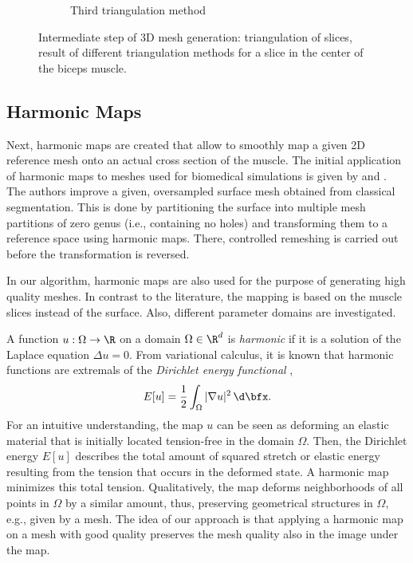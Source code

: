 \begin{figure}
\begin{subfigure}[t]{0.32\textwidth}
    \caption{Third triangulation method}%
    \label{fig:triangulation_2}%
  \end{subfigure}
  \caption{Intermediate step of 3D mesh generation: triangulation of slices, result of different triangulation methods for a slice in the center of the biceps muscle.}%
  \label{fig:triangulations}%
\end{figure}%

\subsection{Harmonic Maps}

Next, harmonic maps are created that allow to smoothly map a given 2D reference mesh onto an actual cross section of the muscle. The initial application of harmonic maps to meshes used for biomedical simulations is given by \cite{marchandise2010quality} and \cite{Marchandise2_2011}. The authors improve a given, oversampled surface mesh obtained from classical segmentation. This is done by partitioning the surface into multiple mesh partitions of zero genus (i.e., containing no holes) and transforming them to a reference space using harmonic maps. There, controlled remeshing is carried out before the transformation is reversed.

In our algorithm, harmonic maps are also used for the purpose of generating high quality meshes. In contrast to the literature, the mapping is based on the muscle slices instead of the surface. Also, different parameter domains are investigated.

A function $u: \Omega \to \R$ on a domain $\Omega \in \R^d$ is \emph{harmonic} if it is a solution of the Laplace equation $Δu = 0$.
From variational calculus, it is known that harmonic functions are extremals of the \emph{Dirichlet energy functional} \cite{weyl1940},
\begin{align*}
  E[u] = \dfrac12 \int_\Omega |\nabla u|^2 \,\d\bfx.
\end{align*}
For an intuitive understanding, the map $u$ can be seen as deforming an elastic material that is initially located tension-free in the domain $\Omega$.
Then, the Dirichlet energy $E[u]$ describes the total amount of squared stretch or elastic energy resulting from the tension that occurs in the deformed state. A harmonic map minimizes this total tension. Qualitatively, the map deforms neighborhoods of all points in $\Omega$ by a similar amount, thus, preserving geometrical structures in $\Omega$, e.g., given by a mesh. The idea of our approach is that 
applying a harmonic map on a mesh with good quality preserves the mesh quality also in the image under the map.

